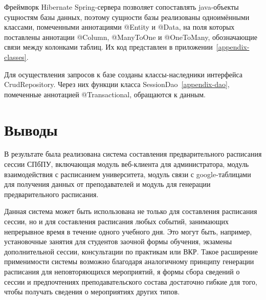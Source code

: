 Фреймворк Hibernate Spring-сервера позволяет сопоставлять java-объекты сущностям базы данных, поэтому сущности базы реализованы одноимёнными классами, помеченными аннотациями @Entity и @Data, на поля которых поставлены аннотации @Column, @ManyToOne и @OneToMany, обозначающие связи между колонками таблиц. Их код представлен в приложении~\ref{appendix-classes}.

Для осуществления запросов к базе созданы классы-наследники интерфейса CrudRepository. Через них функции класса SessionDao~\ref{appendix-dao}, помеченные аннотацией @Transactional, обращаются к данным.

\section{Выводы}

В результате была реализована система составления предварительного расписания сессии СПбПУ, включающая модуль веб-клиента для администратора, модуль взаимодействия с расписанием университета, модуль связи с google-таблицами для получения данных от преподавателей и модуль для генерации предварительного расписания.

Данная система может быть использована не только для составления расписания сессии, но и для  составления расписания любых событий, занимающих непрерывное время в течение одного учебного дня. Это могут быть, например, установочные занятия для студентов заочной формы обучения, экзамены дополнительной сессии, консультации по практикам или ВКР. Такое расширение применимости системы возможно благодаря аналогичному принципу генерации расписания для неповторяющихся мероприятий, я формы сбора сведений о сессии и предпочтениях преподавательского состава достаточно гибкие для того, чтобы получать сведения о мероприятиях других типов.